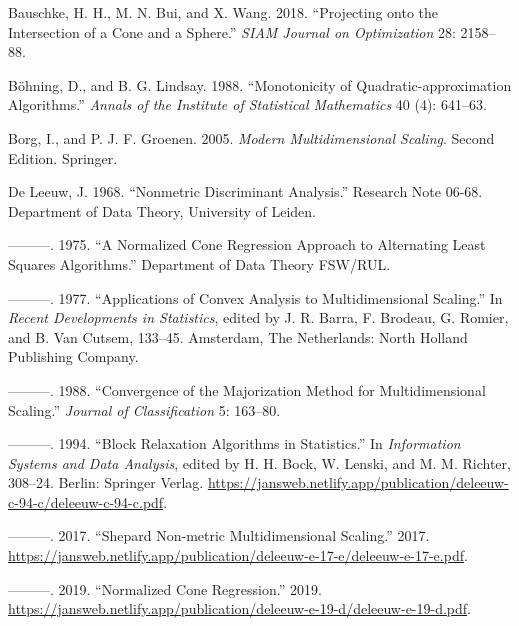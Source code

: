 \documentclass[
  12pt,
  letterpaper,
  DIV=11,
  numbers=noendperiod]{scrartcl}
\newlength{\cslhangindent}
\newenvironment{CSLReferences}[2] %
 {\begin{list}{}{%
  \setlength{\itemindent}{0pt}
  \setlength{\leftmargin}{0pt}
  \setlength{\parsep}{0pt}
  \ifodd #1
   \setlength{\leftmargin}{\cslhangindent}
   \setlength{\itemindent}{-1\cslhangindent}
  \fi
  \setlength{\itemsep}{#2\baselineskip}}}
 {\end{list}}
\begin{document}
\label{refs}
\begin{CSLReferences}{1}{0}
Bauschke, H. H., M. N. Bui, and X. Wang. 2018. {``{Projecting onto the
Intersection of a Cone and a Sphere}.''} \emph{SIAM Journal on
Optimization} 28: 2158--88.

Böhning, D., and B. G. Lindsay. 1988. {``{Monotonicity of
Quadratic-approximation Algorithms}.''} \emph{Annals of the Institute of
Statistical Mathematics} 40 (4): 641--63.

Borg, I., and P. J. F. Groenen. 2005. \emph{Modern Multidimensional
Scaling}. Second Edition. Springer.

De Leeuw, J. 1968. {``Nonmetric Discriminant Analysis.''} Research Note
06-68. Department of Data Theory, University of Leiden.

---------. 1975. {``{A Normalized Cone Regression Approach to
Alternating Least Squares Algorithms}.''} Department of Data Theory
FSW/RUL.

---------. 1977. {``Applications of Convex Analysis to Multidimensional
Scaling.''} In \emph{Recent Developments in Statistics}, edited by J. R.
Barra, F. Brodeau, G. Romier, and B. Van Cutsem, 133--45. Amsterdam, The
Netherlands: North Holland Publishing Company.

---------. 1988. {``Convergence of the Majorization Method for
Multidimensional Scaling.''} \emph{Journal of Classification} 5:
163--80.

---------. 1994. {``{Block Relaxation Algorithms in Statistics}.''} In
\emph{Information Systems and Data Analysis}, edited by H. H. Bock, W.
Lenski, and M. M. Richter, 308--24. Berlin: Springer Verlag.
\url{https://jansweb.netlify.app/publication/deleeuw-c-94-c/deleeuw-c-94-c.pdf}.

---------. 2017. {``{Shepard Non-metric Multidimensional Scaling}.''}
2017.
\url{https://jansweb.netlify.app/publication/deleeuw-e-17-e/deleeuw-e-17-e.pdf}.

---------. 2019. {``Normalized Cone Regression.''} 2019.
\url{https://jansweb.netlify.app/publication/deleeuw-e-19-d/deleeuw-e-19-d.pdf}.


\end{CSLReferences}
\end{document}
